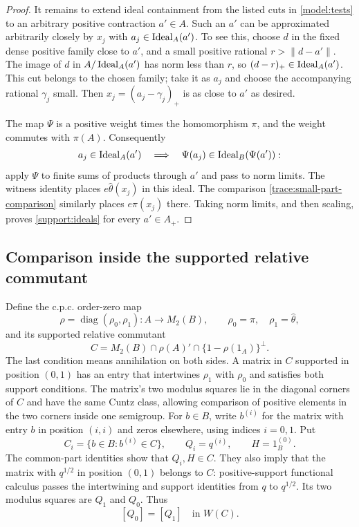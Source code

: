 \begin{proof}
It remains to extend ideal containment from the listed cuts in
\eqref{model:tests} to an arbitrary positive contraction $a'\in A$.
Such an $a'$ can be
approximated arbitrarily closely by $x_j$ with
$a_j\in\operatorname{Ideal}_A(a')$.  To see this, choose $d$ in the fixed dense
positive family close to $a'$, and a small positive rational
$r>\|d-a'\|$.  The image of $d$ in $A/\operatorname{Ideal}_A(a')$ has norm less
than $r$, so $(d-r)_+\in\operatorname{Ideal}_A(a')$.  This cut belongs to the
chosen family; take it as $a_j$ and choose the accompanying rational
$\gamma_j$ small.  Then $x_j=(a_j-\gamma_j)_+$ is as close to $a'$
as desired.

The map $\Psi$ is a positive weight times the homomorphism $\pi$,
and the weight commutes with $\pi(A)$.  Consequently
\[
 a_j\in\operatorname{Ideal}_A(a')
 \quad\Longrightarrow\quad
 \Psi(a_j)\in\operatorname{Ideal}_B(\Psi(a')):
\]
apply $\Psi$ to finite sums of products through $a'$ and pass to
norm limits.  The witness identity places
$e\widehat\theta(x_j)$ in this ideal.  The comparison
\eqref{trace:small-part-comparison} similarly places $e\pi(x_j)$ there.
Taking norm limits, and then scaling, proves
\eqref{support:ideals} for every $a'\in A_+$.
\end{proof}

\subsection{Comparison inside the supported relative commutant}

Define the c.p.c. order-zero map
\[
 \rho=\operatorname{diag}(\rho_0,\rho_1)\colon A\longrightarrow M_2(B),
 \qquad \rho_0=\pi,\quad\rho_1=\widehat\theta,
\]
and its supported relative commutant
\begin{equation}\label{comm:definition}
 C=M_2(B)\cap\rho(A)'\cap\{1-\rho(1_A)\}^{\perp}.
\end{equation}
The last condition means annihilation on both sides.  A matrix in $C$
supported in position $(0,1)$ has an entry that intertwines $\rho_1$
with $\rho_0$ and satisfies both support conditions.  The matrix's two
modulus squares lie in the diagonal corners of $C$ and have the same Cuntz
class, allowing comparison of positive elements in the two corners
inside one semigroup.  For $b\in B$,
write $b^{(i)}$ for the matrix with entry $b$ in position $(i,i)$ and
zeros elsewhere, using indices $i=0,1$.  Put
\[
 C_i=\{b\in B:b^{(i)}\in C\},\qquad
 Q_i=q^{(i)},\qquad H=1_B^{(0)}.
\]
The common-part identities show that $Q_i,H\in C$.  They also imply
that the matrix with $q^{1/2}$ in position $(0,1)$ belongs to $C$:
positive-support functional calculus passes the intertwining and
support identities from $q$ to $q^{1/2}$.  Its two modulus squares
are $Q_1$ and $Q_0$.  Thus
\begin{equation}\label{comm:common-equivalence}
 [Q_0]=[Q_1]\quad\text{in }W(C).
\end{equation}

